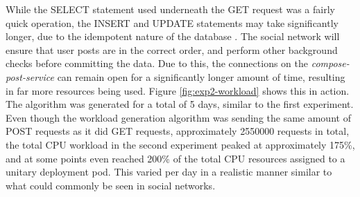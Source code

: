 \begin{center}
\begin{minipage}{\linewidth}
    \label{fig:exp2-workload}
\end{minipage}
\end{center}

While the SELECT statement used underneath the GET request was a fairly quick operation, the INSERT and UPDATE statements may take significantly longer, due to the idempotent nature of the database \cite{lutteroth2009database}. The social network will ensure that user posts are in the correct order, and perform other background checks before committing the data. Due to this, the connections on the \textit{compose-post-service} can remain open for a significantly longer amount of time, resulting in far more resources being used. Figure \ref{fig:exp2-workload} shows this in action. The algorithm was generated for a total of 5 days, similar to the first experiment. Even though the workload generation algorithm was sending the same amount of POST requests as it did GET requests, approximately \num[group-separator={,}]{2550000} requests in total, the total CPU workload in the second experiment peaked at approximately 175\%, and at some points even reached 200\% of the total CPU resources assigned to a unitary deployment pod. This varied per day in a realistic manner similar to what could commonly be seen in social networks.\par

